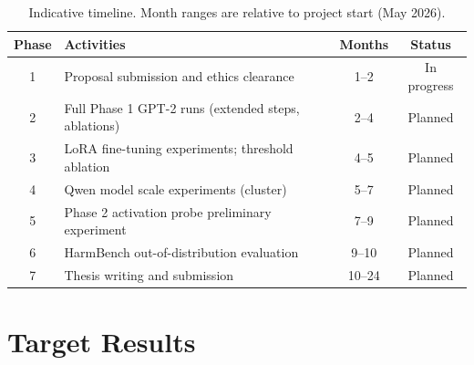 \documentclass[a4paper,twoside,12pt]{report}
\begin{document}
\begin{table}[ht]
  \centering
  \caption{Indicative timeline. Month ranges are relative to project start (May 2026).}
  \label{tab:timeline}
  \begin{tabular}{clcc}
    \toprule
    \textbf{Phase} & \textbf{Activities} & \textbf{Months} & \textbf{Status} \\
    \midrule
    1 & Proposal submission and ethics clearance & 1--2 & In progress \\
    2 & Full Phase 1 GPT-2 runs (extended steps, ablations) & 2--4 & Planned \\
    3 & LoRA fine-tuning experiments; threshold ablation & 4--5 & Planned \\
    4 & Qwen model scale experiments (cluster) & 5--7 & Planned \\
    5 & Phase 2 activation probe preliminary experiment & 7--9 & Planned \\
    6 & HarmBench out-of-distribution evaluation & 9--10 & Planned \\
    7 & Thesis writing and submission & 10--24 & Planned \\
    \bottomrule
  \end{tabular}
\end{table}

\section{Target Results}

\begin{table}[ht]
  \centering
  \caption{Target results table for thesis. [TBD] entries are planned experiments.}
  \label{tab:target}
\end{table}
\end{document}
